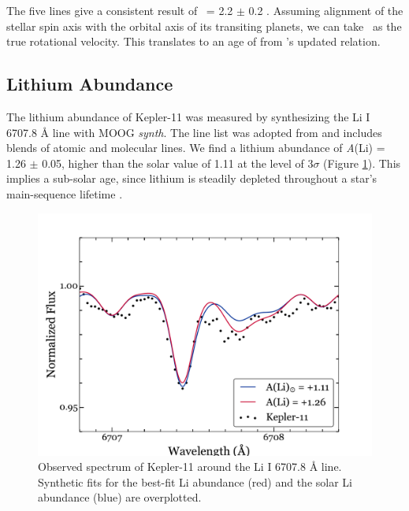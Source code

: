 \documentclass[oneside]{emulateapj}
\begin{document}
The five lines give a consistent result of \vsini\ = 2.2 $\pm$ 0.2 \kms. Assuming alignment of the stellar spin axis with the orbital axis of its transiting planets, we can take \vsini\ as the true rotational velocity.  This translates to an age of  from \citet{dosSantos2016}'s updated relation.

\subsection{Lithium Abundance}
\label{s:lithium}

The lithium abundance of Kepler-11 was measured by synthesizing the Li I 6707.8 \r{A} line with MOOG \textit{synth}. The line list was adopted from \citet{Melendez2012} and includes blends of atomic and molecular lines. We find a lithium abundance of \textit{A}(Li) = 1.26 $\pm$ 0.05, higher than the solar value of 1.11 at the level of 3$\sigma$ (Figure \ref{fig:lithium}). This implies a sub-solar age, since lithium is steadily depleted throughout a star's main-sequence lifetime .

\begin{figure}
\centering
\includegraphics[width=\columnwidth]{lithium}
\caption{Observed spectrum of Kepler-11 around the Li I 6707.8 \r{A} line. Synthetic fits for the best-fit Li abundance (red) and the solar Li abundance (blue) are overplotted. }
\label{fig:lithium}
\end{figure}
\end{document}
